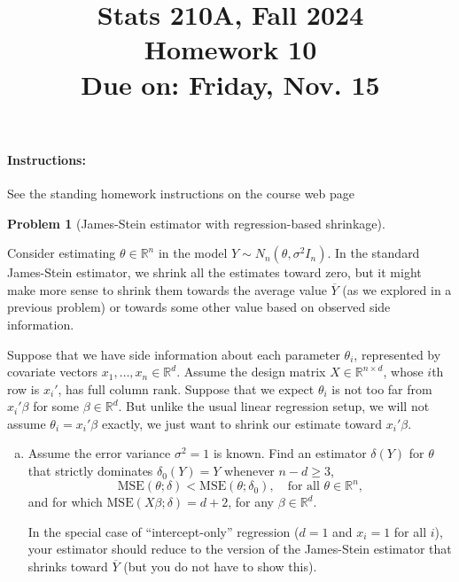 \documentclass{article}
\newcommand{\RR}{\mathbb{R}}
\theoremstyle{definition}
\newtheorem{problem}{Problem}
\begin{document}
\title{Stats 210A, Fall 2024\\
  Homework 10 \\
  {\large {\bf Due on}: Friday, Nov. 15}}
\date{}

\maketitle

\paragraph{Instructions:} See the standing homework instructions on the course web page


\begin{problem}[James-Stein estimator with regression-based shrinkage]
\label{prob:js-regression}

Consider estimating $\theta \in \RR^n$ in the model $Y \sim N_n(\theta, \sigma^2 I_n)$. In the standard James-Stein estimator, we shrink all the estimates toward zero, but it might make more sense to shrink them towards the average value $\overline{Y}$ (as we explored in a previous problem) or towards some other value based on observed side information.

Suppose that we have side information about each parameter $\theta_i$, represented by covariate vectors $x_1,\ldots,x_n \in \RR^d$. Assume the design matrix $X \in \RR^{n\times d}$, whose $i$th row is $x_i'$, has full column rank. Suppose that we expect $\theta_i$ is not too far from $x_i'\beta$ for some $\beta\in \RR^d$. But unlike the usual linear regression setup, we will not assume $\theta_i = x_i'\beta$ exactly, we just want to shrink our estimate toward $x_i'\beta$.

\begin{enumerate}[(a)]

\item Assume the error variance $\sigma^2 = 1$ is known. Find an estimator $\delta(Y)$ for $\theta$ that strictly dominates $\delta_0(Y) = Y$ whenever $n - d \geq 3$,
\[
\text{MSE}(\theta; \delta) < \text{MSE}(\theta; \delta_0), \quad \text{for all } \theta \in \RR^n,
\]
and for which $\text{MSE}(X\beta; \delta) = d + 2$, for any $\beta\in \RR^d$.

In the special case of ``intercept-only'' regression ($d=1$ and $x_i=1$ for all $i$), your estimator should reduce to the version of the James-Stein estimator that shrinks toward $\overline{Y}$ (but you do not have to show this).


\end{enumerate}
\end{problem}
\end{document}

